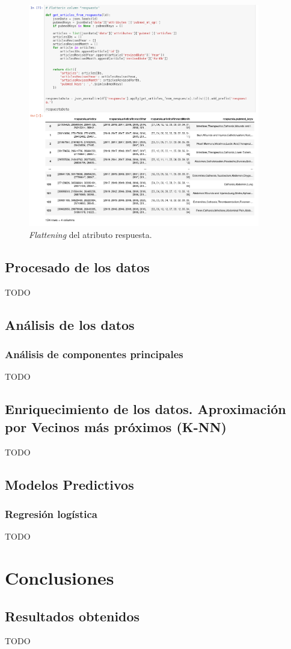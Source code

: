 \documentclass[10pt,a4paper,oneside]{book}
\begin{document}
\paragraph{}
\begin{figure}[!htb]
  \centering
  \includegraphics[width=0.9\textwidth]{images/metodologia-aplanar-respuesta.png}
  \caption{\textit{Flattening} del atributo respuesta.}
\end{figure}



\newpage
\section{Procesado de los datos}
TODO

\section{Análisis de los datos}

\subsection{Análisis de componentes principales}
TODO

\section{Enriquecimiento de los datos. Aproximación por Vecinos más próximos (K-NN)}
TODO

\section{Modelos Predictivos}

\subsection{Regresión logística}
TODO

\chapter{Conclusiones}

\section{Resultados obtenidos}
TODO
\end{document}
